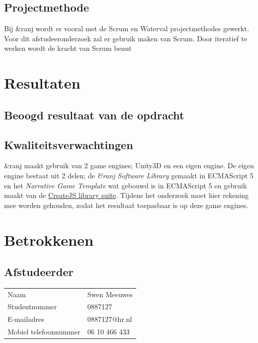 \documentclass{report}
\makeatletter
\newcommand{\name}{Swen Meeuwes}
\newcommand{\studentnumber}{0887127}
\newcommand{\email}{0887127@hr.nl}
\newcommand{\mobilephone}{06 10 466 433}
\newcommand{\organisation}{\&ranj}
\makeatother
\begin{document}
\section{Projectmethode}
Bij \organisation{} wordt er vooral met de Scrum en Waterval projectmethodes gewerkt. Voor dit afstudeeronderzoek zal er gebruik maken van Scrum. Door iteratief te werken wordt de kracht van Scrum benut


\chapter{Resultaten}

\section{Beoogd resultaat van de opdracht}

\section{Kwaliteitsverwachtingen}
\organisation{} maakt gebruik van 2 game engines; Unity3D en een eigen engine. De eigen engine bestaat uit 2 delen; de \emph{\organisation{} Software Library} gemaakt in ECMAScript 5 en het \emph{Narrative Game Template} wat gebouwd is in ECMAScript 5 en gebruik maakt van de \href{https://createjs.com/}{CreateJS library suite}. Tijdens het onderzoek moet hier rekening mee worden gehouden, zodat het resultaat toepasbaar is op deze game engines.


\renewcommand{\bibname}{Literatuur}

\nocite{*}

\chapter{Betrokkenen}

\section*{Afstudeerder}
\begin{table}[h]
\begin{tabular}{ll}
Naam & \name \\
Studentnummer & \studentnumber \\
E-mailadres & \email \\
Mobiel telefoonnummer & \mobilephone
\end{tabular}
\end{table}
\end{document}
